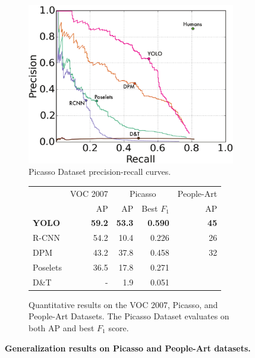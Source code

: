 \documentclass[10pt,twocolumn,letterpaper]{article}
\begin{document}
\begin{figure}
\centering
\begin{subfigure}[b]{.45\textwidth}
    \centering
    \includegraphics[width=\textwidth]{cubist}
    \caption{\small Picasso Dataset precision-recall curves.}
\end{subfigure}%
\begin{subfigure}[b]{.55\textwidth}
    \centering
    \begin{tabular}{l|r|rr|r}
& VOC 2007 & \multicolumn{2}{c|}{Picasso} & People-Art\\
 & AP & AP & Best $F_1$ & AP\\
\hline
\textbf{YOLO} & \textbf{59.2} & \textbf{53.3} & \textbf{0.590} & \textbf{45}\\
R-CNN & 54.2 & 10.4 & 0.226 & 26\\
DPM & 43.2 & 37.8 & 0.458 & 32\\
Poselets \cite{BourdevMalikICCV09} & 36.5 & 17.8 & 0.271 \\
D\&T \cite{dalal2005histograms} & - & 1.9 & 0.051 \\
\end{tabular}
\caption{\small Quantitative results on the VOC 2007, Picasso, and People-Art Datasets. The Picasso Dataset evaluates on both AP and best $F_1$ score.}
\end{subfigure}
\caption{\small \textbf{Generalization results on Picasso and People-Art datasets.}}
\label{art}
\end{figure}
\end{document}
